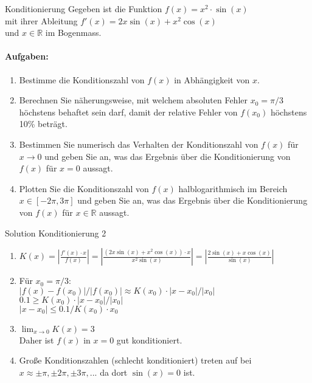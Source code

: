 \begin{example2}{Konditionierung}
Gegeben ist die Funktion
$f(x) = x^2 \cdot \sin(x)$\\
mit ihrer Ableitung
$f'(x) = 2x\sin(x) + x^2\cos(x)$\\
und $x \in \mathbb{R}$ im Bogenmass.

\paragraph{Aufgaben:}
\begin{enumerate}
    \item Bestimme die Konditionszahl von $f(x)$ in Abhängigkeit von $x$.
    \item Berechnen Sie näherungsweise, mit welchem absoluten Fehler $x_0 = \pi/3$ höchstens behaftet sein darf, damit der relative Fehler von $f(x_0)$ höchstens 10\% beträgt.
    \item Bestimmen Sie numerisch das Verhalten der Konditionszahl von $f(x)$ für $x \to 0$ und geben Sie an, was das Ergebnis über die Konditionierung von $f(x)$ für $x = 0$ aussagt.
    \item Plotten Sie die Konditionszahl von $f(x)$ halblogarithmisch im Bereich $x \in [-2\pi, 3\pi]$ und geben Sie an, was das Ergebnis über die Konditionierung von $f(x)$ für $x \in \mathbb{R}$ aussagt.
\end{enumerate}
\end{example2}

\begin{KR}{Solution Konditionierung 2}
\begin{enumerate}
    \item $K(x) = \left|\frac{f'(x)\cdot x}{f(x)}\right| = \left|\frac{(2x\sin(x)+x^2\cos(x))\cdot x}{x^2\sin(x)}\right| = \left|\frac{2\sin(x)+x\cos(x)}{\sin(x)}\right|$
    
    \item Für $x_0 = \pi/3$:\\
    $|f(x)-f(x_0)|/|f(x_0)| \approx K(x_0)\cdot|x-x_0|/|x_0|$\\
    $0.1 \geq K(x_0)\cdot|x-x_0|/|x_0|$\\
    $|x-x_0| \leq 0.1/K(x_0)\cdot x_0$
    
    \item $\lim_{x \to 0} K(x) = 3$\\
    Daher ist $f(x)$ in $x=0$ gut konditioniert.
    
    \item Große Konditionszahlen (schlecht konditioniert) treten auf bei $x \approx \pm\pi, \pm2\pi, \pm3\pi,...$ da dort $\sin(x)=0$ ist.
\end{enumerate}
\end{KR}



